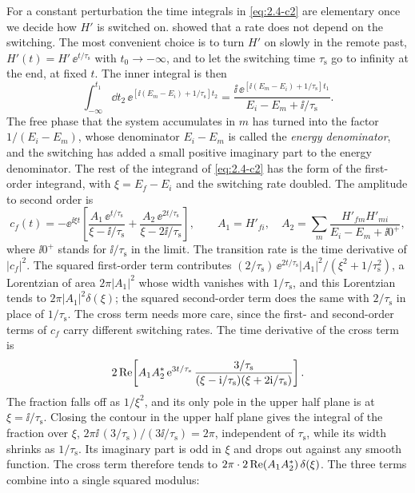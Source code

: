 For a constant perturbation the time integrals in \cref{eq:2.4-c2} are elementary once we decide how $H'$ is switched on.  showed that a rate does not depend on the switching. The most convenient choice is to turn $H'$ on slowly in the remote past, $H'(t) = H'\,\ee^{t/\tau_{\mathrm{s}}}$ with $t_0 \to -\infty$, and to let the switching time $\tau_{\mathrm{s}}$ go to infinity at the end, at fixed $t$. The inner integral is then
\begin{equation*}
  \int_{-\infty}^{t_1}\dd t_2\,\ee^{[\ii(E_m - E_i) + 1/\tau_{\mathrm{s}}]t_2}
  = \frac{\ii\,\ee^{[\ii(E_m - E_i) + 1/\tau_{\mathrm{s}}]t_1}}{E_i - E_m + \ii/\tau_{\mathrm{s}}} .
\end{equation*}
The free phase that the system accumulates in $m$ has turned into the factor $1/(E_i - E_m)$, whose denominator $E_i - E_m$ is called the \emph{energy denominator}, and the switching has added a small positive imaginary part to the energy denominator. The rest of the integrand of \cref{eq:2.4-c2} has the form of the first-order integrand, with $\xi = E_f - E_i$ and the switching rate doubled. The amplitude to second order is
\begin{equation*}
  c_f(t) = -\ee^{\ii\xi t}\left[\frac{A_1\,\ee^{t/\tau_{\mathrm{s}}}}{\xi - \ii/\tau_{\mathrm{s}}} + \frac{A_2\,\ee^{2t/\tau_{\mathrm{s}}}}{\xi - 2\ii/\tau_{\mathrm{s}}}\right],
  \qquad A_1 = H'_{fi},\quad A_2 = \sum_m\frac{H'_{fm}H'_{mi}}{E_i - E_m + \ii0^+} ,
\end{equation*}
where $\ii0^+$ stands for $\ii/\tau_{\mathrm{s}}$ in the limit. The transition rate is the time derivative of $|c_f|^2$. The squared first-order term contributes $(2/\tau_{\mathrm{s}})\,\ee^{2t/\tau_{\mathrm{s}}}|A_1|^2/(\xi^2 + 1/\tau_{\mathrm{s}}^2)$, a Lorentzian of area $2\pi|A_1|^2$ whose width vanishes with $1/\tau_{\mathrm{s}}$, and this Lorentzian tends to $2\pi|A_1|^2\delta(\xi)$; the squared second-order term does the same with $2/\tau_{\mathrm{s}}$ in place of $1/\tau_{\mathrm{s}}$. The cross term needs more care, since the first- and second-order terms of $c_f$ carry different switching rates. The time derivative of the cross term is
\begin{equation*}
  2\operatorname{Re}\!\left[A_1A_2^*\,\mathrm{e}^{3t/\tau_{\mathrm{s}}}\,\frac{3/\tau_{\mathrm{s}}}{(\xi - \mathrm{i}/\tau_{\mathrm{s}})(\xi + 2\mathrm{i}/\tau_{\mathrm{s}})}\right] .
\end{equation*}
The fraction falls off as $1/\xi^2$, and its only pole in the upper half plane is at $\xi = \ii/\tau_{\mathrm{s}}$. Closing the contour in the upper half plane gives the integral of the fraction over $\xi$, $2\pi\ii\,(3/\tau_{\mathrm{s}})/(3\ii/\tau_{\mathrm{s}}) = 2\pi$, independent of $\tau_{\mathrm{s}}$, while its width shrinks as $1/\tau_{\mathrm{s}}$. Its imaginary part is odd in $\xi$ and drops out against any smooth function. The cross term therefore tends to $2\pi\cdot 2\operatorname{Re}(A_1A_2^*)\,\delta(\xi)$. The three terms combine into a single squared modulus:
